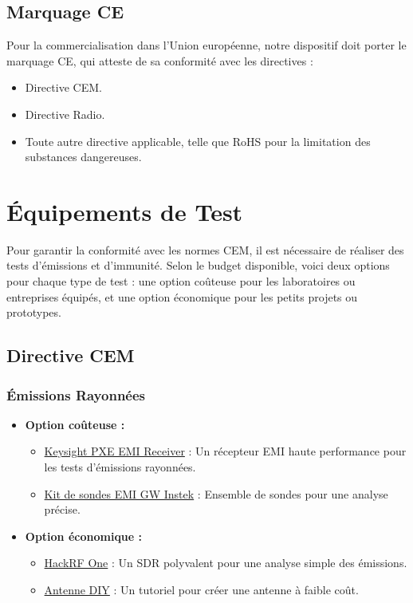 \documentclass[a4paper,12pt]{article}
\begin{document}
\subsection{Marquage CE}
Pour la commercialisation dans l'Union européenne, notre dispositif doit porter le marquage CE, qui atteste de sa conformité avec les directives :
\begin{itemize}
    \item Directive CEM.
    \item Directive Radio.
    \item Toute autre directive applicable, telle que RoHS pour la limitation des substances dangereuses.
\end{itemize}

\newpage

\section{Équipements de Test}
Pour garantir la conformité avec les normes CEM, il est nécessaire de réaliser des tests d’émissions et d’immunité. Selon le budget disponible, voici deux options pour chaque type de test : une option coûteuse pour les laboratoires ou entreprises équipés, et une option économique pour les petits projets ou prototypes.
\subsection{Directive CEM}
\subsubsection{Émissions Rayonnées}
\begin{itemize}
    \item \textbf{Option coûteuse :}
          \begin{itemize}
              \item \href{https://www.keysight.com/us/en/product/N9048B/pxe-emi-receiver-1-hz-44-ghz.html}{Keysight PXE EMI Receiver} : Un récepteur EMI haute performance pour les tests d'émissions rayonnées.
              \item \href{https://eleshop.fr/gw-instek-gkt-008-emi-probe-kit.html}{Kit de sondes EMI GW Instek} : Ensemble de sondes pour une analyse précise.
          \end{itemize}
    \item \textbf{Option économique :}
          \begin{itemize}
              \item \href{https://greatscottgadgets.com/hackrf/one/}{HackRF One} : Un SDR polyvalent pour une analyse simple des émissions.
              \item \href{https://www.youtube.com/watch?v=2xy3Hm1_ZqI}{Antenne DIY} : Un tutoriel pour créer une antenne à faible coût.
          \end{itemize}
\end{itemize}
\end{document}
